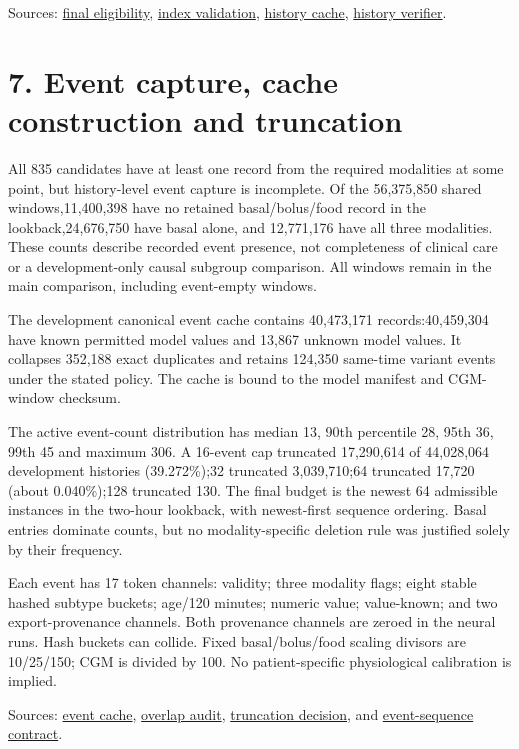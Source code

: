 \documentclass[11pt,a4paper]{article}
\begin{document}
Sources: \href{loop_final_cgm_temporal_eligibility.md}{final eligibility}, \href{loop_window_index_validation.md}{index validation}, \href{loop_full_cgm_history_gate.md}{history cache}, \href{../audit/loop_cgm_history_cache_validation.json}{history verifier}.

\section*{7. Event capture, cache construction and truncation}
All 835 candidates have at least one record from the required modalities at some point, but history-level event capture is incomplete. Of the 56,375,850 shared windows,11,400,398 have no retained basal/bolus/food record in the lookback,24,676,750 have basal alone, and 12,771,176 have all three modalities. These counts describe recorded event presence, not completeness of clinical care or a development-only causal subgroup comparison. All windows remain in the main comparison, including event-empty windows.

The development canonical event cache contains 40,473,171 records:40,459,304 have known permitted model values and 13,867 unknown model values. It collapses 352,188 exact duplicates and retains 124,350 same-time variant events under the stated policy. The cache is bound to the model manifest and CGM-window checksum.

The active event-count distribution has median 13, 90th percentile 28, 95th 36, 99th 45 and maximum 306. A 16-event cap truncated 17,290,614 of 44,028,064 development histories (39.272\%);32 truncated 3,039,710;64 truncated 17,720 (about 0.040\%);128 truncated 130. The final budget is the newest 64 admissible instances in the two-hour lookback, with newest-first sequence ordering. Basal entries dominate counts, but no modality-specific deletion rule was justified solely by their frequency.

Each event has 17 token channels: validity; three modality flags; eight stable hashed subtype buckets; age/120 minutes; numeric value; value-known; and two export-provenance channels. Both provenance channels are zeroed in the neural runs. Hash buckets can collide. Fixed basal/bolus/food scaling divisors are 10/25/150; CGM is divided by 100. No patient-specific physiological calibration is implied.

Sources: \href{loop_event_instance_cache.md}{event cache}, \href{loop_multimodal_overlap_audit.md}{overlap audit}, \href{loop_event_sequence_truncation_result.md}{truncation decision}, and \href{loop_event_sequence_contract.md}{event-sequence contract}.
\end{document}
